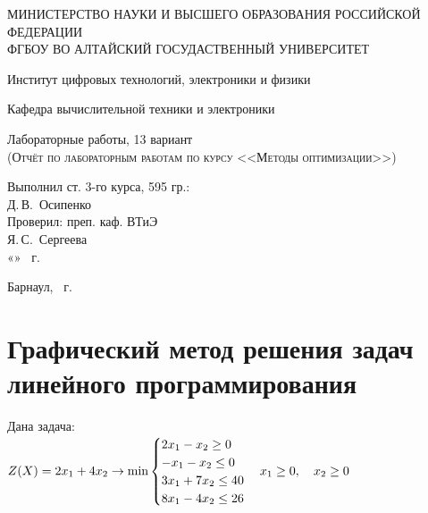 \documentclass[a4paper, 12pt]{article}
\begin{document}
\begin{titlepage}
  \begin{center}
    \MakeUppercase{Министерство науки и высшего образования Российской Федерации} \\
    \MakeUppercase{ФГБОУ ВО Алтайский госудаственный университет}
    \vspace{0.25cm}
    
	  Институт цифровых технологий, электроники и физики
    
    Кафедра вычислительной техники и электроники
    \vfill
    
    {\LARGE Лабораторные работы, 13 вариант}\\[5mm]
    \textsc{(Отчёт по лабораторным работам по курсу <<Методы оптимизации>>)}
  \bigskip

\end{center}
\vfill

\newlength{\ML}
\hfill
\begin{minipage}{0.45\textwidth}
  Выполнил ст. 3-го курса, 595 гр.:\\
  \underline{\hspace{\ML}} Д.\,В.~Осипенко\\
  Проверил: преп. каф. ВТиЭ\\
  \underline{\hspace{\ML}} Я.\,С.~Сергеева\\
  «\underline{\hspace{0.7cm}}» \underline{\hspace{2cm}} \the\year~г.
\end{minipage}%
\vfill

\begin{center}
  Барнаул, \the\year~г.
\end{center}
\end{titlepage}
\tableofcontents
\newpage

\section{Графический метод решения задач линейного программирования}
Дана задача:\\

\begin{math}
  Z(X)=2x_1+4x_2 \rightarrow  \text{min} \\
  \begin{cases}
    2x_1-x_2 \geq 0\\
    -x_1-x_2 \leq 0\\
    3x_1+7x_2 \leq 40\\
    8x_1-4x_2 \leq 26\\
  \end{cases}\\
  x_1\geq 0, \quad x_2\geq 0
\end{math}\\
\end{document}
